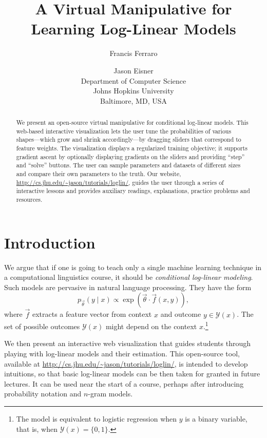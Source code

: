 \documentclass[11pt,letterpaper]{article}
\title{A Virtual Manipulative for Learning Log-Linear Models}
\author{
Francis Ferraro \and Jason Eisner\\
Department of Computer Science\\
Johns Hopkins University\\
Baltimore, MD, USA
}
\date{}
\newcommand{\WhereToFind}[0]{\url{http://cs.jhu.edu/~jason/tutorials/loglin/}}
\begin{document}
\maketitle

\begin{abstract}
  We present an open-source virtual manipulative for conditional
  log-linear models. This web-based interactive visualization lets
  the user tune the probabilities of various shapes---which grow and
  shrink accordingly---by dragging sliders that correspond to feature
  weights.  The visualization displays a regularized training
  objective; it supports gradient ascent by optionally displaying
  gradients on the sliders and providing ``step'' and ``solve''
  buttons.  The user can sample parameters and datasets of
  different sizes and compare their own parameters to the truth.  Our
  website, \WhereToFind{}, guides the user through a series of
  interactive lessons and provides auxiliary readings, explanations, 
practice problems and resources.
\end{abstract}

\section{Introduction}\label{sec:intro}
We argue that if one is going to teach only a single machine learning
technique in a computational linguistics course, it should be {\em
  conditional log-linear modeling}.  Such models are pervasive in
natural language processing.  They have the form
\begin{equation}\label{eqn:loglin}
p_{\vec{\theta}}(y \mid x) \propto \exp{\left(\vec{\theta} \cdot \vec{f}\left(x,y\right)\right)},
\end{equation}
where $\vec{f}$ extracts a feature vector from context $x$ and
outcome $y \in \mathcal{Y}(x)$.  The set of possible
outcomes $\mathcal{Y}(x)$ might depend on the context
$x$.\footnote{The model is equivalent to logistic regression
  when $y$ is a binary variable, that is, when $\mathcal{Y}(x)=\{0,1\}$.}

We then present an interactive web visualization that guides students
through playing with log-linear models and their estimation. This open-source 
tool, available at \WhereToFind{}, is intended to develop intuitions, so that basic
log-linear models can be then taken for granted in future lectures.  It can be used near
the start of a course, perhaps after introducing probability notation
and $n$-gram models.
\end{document}
